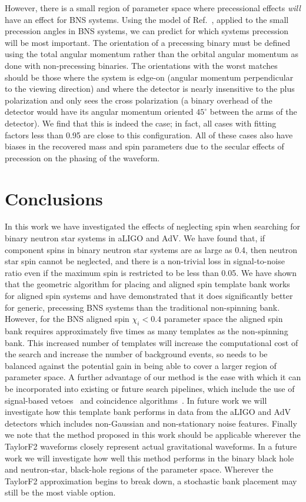 However, there is a small region of parameter space where precessional effects \textit{will}
have an effect for BNS systems.
Using the model of Ref.~\cite{Brown:2012gs}, applied to the small precession angles in BNS systems, 
we can predict for which systems precession will be most important.
The orientation of a precessing binary must be defined using the total angular momentum rather than the 
orbital angular momentum as done with non-precessing binaries. 
The orientations with the worst matches should be those where the system is edge-on 
(angular momentum perpendicular to the viewing direction) and where the detector is nearly insensitive 
to the plus polarization and only sees the cross polarization (a binary overhead of the detector would have 
its angular momentum oriented $45^{\circ}$ between the arms of the detector).
We find that
this is indeed the case; in fact, all cases with fitting factors less than 0.95 are close to
this configuration. All of these cases also have biases in the recovered mass and
spin parameters due to the secular effects of precession on the phasing of the waveform.

\section{Conclusions}

In this work we have investigated the effects of neglecting spin when
searching for binary neutron star systems in aLIGO and AdV. We have found
that, if component spins in binary neutron star systems are as large as 0.4,
then neutron star spin cannot be neglected, and there is a non-trivial loss in
signal-to-noise ratio even if the maximum spin is restricted to be less than
0.05. We have shown that the
geometric algorithm for placing and aligned spin template bank works for
aligned spin systems and have demonstrated that it does significantly better
for generic, precessing BNS systems than the traditional non-spinning bank.
However, for the BNS aligned spin $\chi_i < 0.4$ parameter space the aligned
spin bank requires approximately five times as many templates as the
non-spinning bank. This increased number of templates will increase the
computational cost of the search and increase the number of background events,
so needs to be balanced against the potential gain in being able to cover a
larger region of parameter space. A further advantage of our method is the ease
with which it can be incorporated into existing or future search
pipelines, which include the use of signal-based vetoes~\cite{Allen:2004gu}
and coincidence algorithms~\cite{Robinson:2008}. In future work we will
investigate how this template bank performs in data from the aLIGO and AdV
detectors which includes non-Gaussian and non-stationary noise features.
Finally we note that the method proposed in this work should be applicable
wherever the TaylorF2 waveforms closely represent actual gravitational
waveforms. In a future work we will investigate how well this method performs
in the binary black hole and neutron-star, black-hole regions of the parameter space.
Wherever the TaylorF2 approximation begins to break down, a stochastic
bank placement may still be the most viable option.
